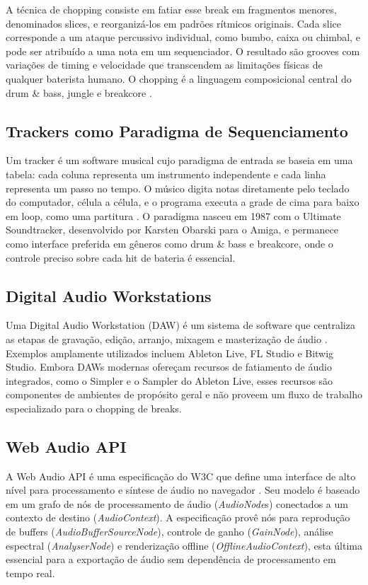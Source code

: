 \documentclass[portuguese]{sbc2025}
\begin{document}
A técnica de chopping consiste em fatiar esse break em fragmentos menores, denominados slices, e reorganizá-los em padrões rítmicos originais. Cada slice corresponde a um ataque percussivo individual, como bumbo, caixa ou chimbal, e pode ser atribuído a uma nota em um sequenciador. O resultado são grooves com variações de timing e velocidade que transcendem as limitações físicas de qualquer baterista humano. O chopping é a linguagem composicional central do drum \& bass, jungle e breakcore \citep{schloss2004making}.

\subsection{Trackers como Paradigma de Sequenciamento}

Um tracker é um software musical cujo paradigma de entrada se baseia em uma tabela: cada coluna representa um instrumento independente e cada linha representa um passo no tempo. O músico digita notas diretamente pelo teclado do computador, célula a célula, e o programa executa a grade de cima para baixo em loop, como uma partitura \citep{roads1996computer}. O paradigma nasceu em 1987 com o Ultimate Soundtracker, desenvolvido por Karsten Obarski para o Amiga, e permanece como interface preferida em gêneros como drum \& bass e breakcore, onde o controle preciso sobre cada hit de bateria é essencial.

\subsection{Digital Audio Workstations}

Uma Digital Audio Workstation (DAW) é um sistema de software que centraliza as etapas de gravação, edição, arranjo, mixagem e masterização de áudio \citep{izhaki2012mixing}. Exemplos amplamente utilizados incluem Ableton Live, FL Studio e Bitwig Studio. Embora DAWs modernas ofereçam recursos de fatiamento de áudio integrados, como o Simpler e o Sampler do Ableton Live, esses recursos são componentes de ambientes de propósito geral e não proveem um fluxo de trabalho especializado para o chopping de breaks.

\subsection{Web Audio API}

A Web Audio API é uma especificação do W3C que define uma interface de alto nível para processamento e síntese de áudio no navegador \citep{webaudioapi2021}. Seu modelo é baseado em um grafo de nós de processamento de áudio (\textit{AudioNode}s) conectados a um contexto de destino (\textit{AudioContext}). A especificação provê nós para reprodução de buffers (\textit{AudioBufferSourceNode}), controle de ganho (\textit{GainNode}), análise espectral (\textit{AnalyserNode}) e renderização offline (\textit{OfflineAudioContext}), esta última essencial para a exportação de áudio sem dependência de processamento em tempo real.
\end{document}

